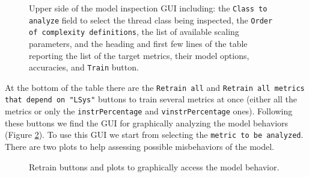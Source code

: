 \documentclass[a4paper, 10pt]{article}
\begin{document}
\begin{figure}[t!]
\centering
{}
\caption{Upper 
side of the model inspection GUI including: the \texttt{Class to analyze} field to select the thread class
being inspected, the \texttt{Order of complexity definitions}, the list of available scaling parameters, and the heading and first few lines
of the table reporting the list of the target metrics, their model options, accuracies, and \texttt{Train} button.
}
\label{fig:extrapolationListInspection}
\end{figure}

At the bottom of the table there are the \verb!Retrain all! and \texttt{Retrain all metrics that depend on "LSys"} buttons to train
several metrics at once (either all the metrics or only the \verb!instrPercentage! and \verb!vinstrPercentage! ones).
Following these buttons we find the GUI for graphically analyzing the model behaviors (Figure \ref{fig:investigationPlots}).
To use this GUI we start from selecting the \texttt{metric to be analyzed}. There are two plots to help assessing possible misbehaviors of the model.

\begin{figure}[t!]
\centering
{}
\caption{Retrain buttons and plots to graphically access the model behavior.
}
\label{fig:investigationPlots}
\end{figure}
\end{document}
